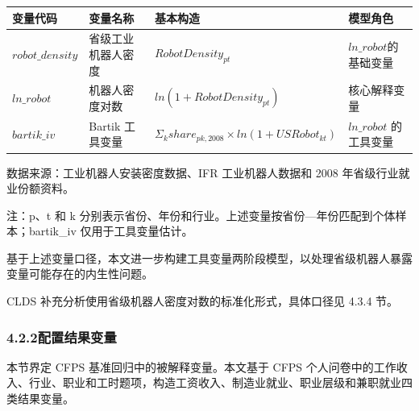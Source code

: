 {\def\LTcaptype{none} %
\begin{longtable}[]{@{}
  >{\centering\arraybackslash}p{}
  >{\raggedright\arraybackslash}p{}
  >{\centering\arraybackslash}p{}
  >{\raggedright\arraybackslash}p{}@{}}
\toprule\noalign{}
\begin{minipage}[b]{\linewidth}\centering
\textbf{变量代码}
\end{minipage} & \begin{minipage}[b]{\linewidth}\centering
\textbf{变量名称}
\end{minipage} & \begin{minipage}[b]{\linewidth}\centering
\textbf{基本构造}
\end{minipage} & \begin{minipage}[b]{\linewidth}\centering
\textbf{模型角色}
\end{minipage} \\
\midrule\noalign{}
\endhead
\bottomrule\noalign{}
\endlastfoot
\(robot\_ density\) & 省级工业机器人密度 & \(RobotDensity_{pt}\) & \(ln\_ robot\)的基础变量 \\
\(ln\_ robot\) & 机器人密度对数 & \(ln(1 + RobotDensity_{pt})\) & 核心解释变量 \\
\(bartik\_ iv\) & Bartik 工具变量 & \(\Sigma_{k}share_{pk,2008} \times ln(1 + USRobot_{kt})\) & \(ln\_ robot\) 的工具变量 \\
\end{longtable}
}

数据来源：工业机器人安装密度数据、IFR 工业机器人数据和 2008 年省级行业就业份额资料。

注：p、t 和 k 分别表示省份、年份和行业。上述变量按省份---年份匹配到个体样本；bartik\_iv 仅用于工具变量估计。

基于上述变量口径，本文进一步构建工具变量两阶段模型，以处理省级机器人暴露变量可能存在的内生性问题。

CLDS 补充分析使用省级机器人密度对数的标准化形式，具体口径见 4.3.4 节。

\subsubsection{4.2.2配置结果变量}\label{ux914dux7f6eux7ed3ux679cux53d8ux91cf}

本节界定 CFPS 基准回归中的被解释变量。本文基于 CFPS 个人问卷中的工作收入、行业、职业和工时题项，构造工资收入、制造业就业、职业层级和兼职就业四类结果变量。

